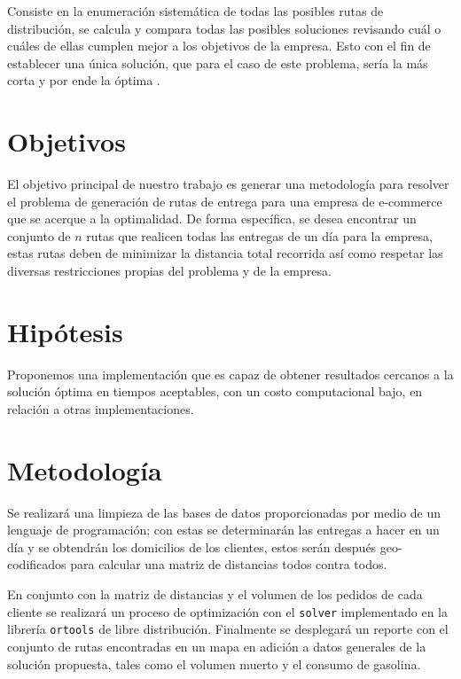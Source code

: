 \documentclass[journal]{IEEEtran}
\begin{document}
            Consiste en la enumeración sistemática de todas las posibles rutas de distribución, se calcula y compara todas las posibles soluciones revisando cuál o cuáles de ellas cumplen mejor a los objetivos de la empresa. Esto con el fin de establecer una única solución, que para el caso de este problema, sería la más corta y por ende la óptima \cite{trevelingProb}.
    
    \section{Objetivos} \label{sec:objectives}

        El objetivo principal de nuestro trabajo es generar una metodología para resolver el problema de generación de rutas de entrega para una empresa de e-commerce que se acerque a la optimalidad. De forma específica, se desea encontrar un conjunto de $n$ rutas que realicen todas las entregas de un día para la empresa, estas rutas deben de minimizar la distancia total recorrida así como respetar las diversas restricciones propias del problema y de la empresa.

    \section{Hipótesis} \label{sec:hyp}
            
        Proponemos una implementación que es capaz de obtener resultados cercanos a la solución óptima en tiempos aceptables, con un costo computacional bajo, en relación a otras implementaciones. 
    
    \section{Metodología} \label{sec:method}

        Se realizará una limpieza de las bases de datos proporcionadas por medio de un lenguaje de programación; con estas se determinarán las entregas a hacer en un día y se obtendrán los domicilios de los clientes, estos serán después geo-codificados para calcular una matriz de distancias todos contra todos.

        En conjunto con la matriz de distancias y el volumen de los pedidos de cada cliente se realizará un proceso de optimización con el \texttt{solver} implementado en la librería \texttt{ortools} \cite{google-2021} de libre distribución. Finalmente se desplegará un reporte con el conjunto de rutas encontradas en un mapa en adición a datos generales de la solución propuesta, tales como el volumen muerto y el consumo de gasolina.
\end{document}
